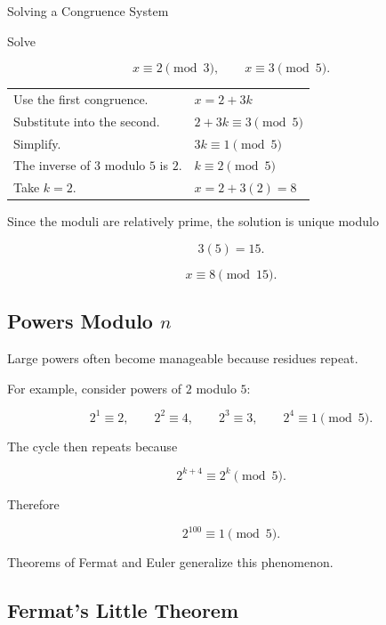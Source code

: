 \begin{workedexamplebox}{Solving a Congruence System}

Solve

\[ x\equiv2\pmod3,\qquad x\equiv3\pmod5. \]

\begin{tabularx}{\textwidth}{@{}>{\raggedright\arraybackslash}p{}X@{}}
Use the first congruence. &
\(x=2+3k\)\\
Substitute into the second. &
\(2+3k\equiv3\pmod5\)\\
Simplify. &
\(3k\equiv1\pmod5\)\\
The inverse of \(3\) modulo \(5\) is \(2\). &
\(k\equiv2\pmod5\)\\
Take \(k=2\). &
\(x=2+3(2)=8\)
\end{tabularx}

Since the moduli are relatively prime, the solution is unique modulo

\[ 3(5)=15. \]

\begin{answerbox}
\[ \boxed{x\equiv8\pmod{15}.} \]
\end{answerbox}
\end{workedexamplebox}

\subsection{Powers Modulo \(n\)}
\label{subsec:powers-modulo-n}

Large powers often become manageable because residues repeat.

For example, consider powers of \(2\) modulo \(5\):

\[ 2^1\equiv2,\qquad2^2\equiv4,\qquad2^3\equiv3,\qquad2^4\equiv1\pmod5. \]

The cycle then repeats because

\[ 2^{k+4}\equiv2^k\pmod5. \]

Therefore

\[ 2^{100}\equiv1\pmod5. \]

Theorems of Fermat and Euler generalize this phenomenon.

\subsection{Fermat's Little Theorem}
\label{subsec:fermats-little-theorem}

